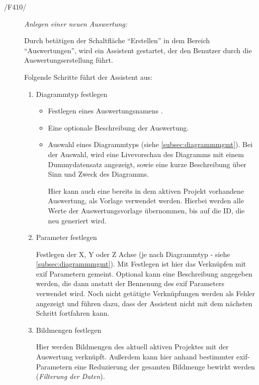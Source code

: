 	\begin{description}
		
		\item[/F410/] \textit{Anlegen einer neuen Auswertung:}\par Durch betätigen der Schaltfläche "`Erstellen"' in dem Bereich "`Auswertungen"', wird ein Assistent gestartet, der den Benutzer durch die Auswertungserstellung führt.\par Folgende Schritte führt der Assistent aus:

			\begin{enumerate}

				\item Diagrammtyp festlegen

					\begin{itemize}

						\item Festlegen eines Auswertungsnamens .

						\item Eine optionale Beschreibung der Auswertung.

						\item Auswahl eines Diagrammtyps (siehe \ref{subsec:diagrammmgmt}). Bei der Auswahl, wird eine Livevorschau des Diagramms mit einem Dummydatensatz angezeigt, sowie eine kurze Beschreibung über Sinn und Zweck des Diagramms.\par Hier kann auch eine bereits in dem aktiven Projekt vorhandene Auswertung, als Vorlage verwendet werden. Hierbei werden alle Werte der Auswertungsvorlage übernommen, bis auf die ID, die neu generiert wird.

					\end{itemize}

				\item Parameter festlegen\par	Festlegen der X, Y oder Z Achse (je nach Diagrammtyp - siehe \ref{subsec:diagrammmgmt}). Mit Festlegen ist hier das Verknüpfen mit \gls{exif} Parametern gemeint. Optional kann eine Beschreibung angegeben werden, die dann anstatt der Bennenung des \gls{exif} Parameters verwendet wird. Noch nicht getätigte Verknüpfungen werden als Fehler angezeigt und führen dazu, dass der Assistent nicht mit dem nächsten Schritt fortfahren kann.

				\item Bildmengen festlegen\par Hier werden Bildmengen des aktuell aktiven Projektes mit der Auswertung verknüpft. Außerdem kann hier anhand bestimmter \gls{exif}-Parametern eine Reduzierung der gesamten Bildmenge bewirkt werden (\textit{Filterung der Daten}).


\end{enumerate}
\end{description}
